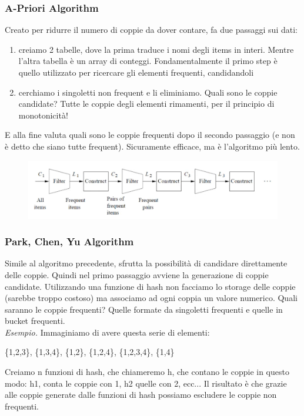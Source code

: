 \subsubsection{A-Priori Algorithm}
Creato per ridurre il numero di coppie da dover contare, fa due passaggi sui dati:
\begin{enumerate}
    \item creiamo 2 tabelle, dove la prima traduce i nomi degli items in interi. Mentre l'altra tabella è un array di conteggi. Fondamentalmente il primo step è quello utilizzato per ricercare gli elementi frequenti, candidandoli
    \item cerchiamo i singoletti non frequent e li eliminiamo. Quali sono le coppie candidate? Tutte le coppie degli elementi rimamenti, per il principio di monotonicità! 
\end{enumerate}
E alla fine valuta quali sono le coppie frequenti dopo il secondo passaggio (e non è detto che siano tutte frequent). Sicuramente efficace, ma è l'algoritmo più lento. 
\\
\begin{figure}[th]
    \centering
    \includegraphics[scale=0.5]{FrequentItems/img/apriori.png}
\end{figure}

\subsubsection{Park, Chen, Yu Algorithm}
Simile al algoritmo precedente, sfrutta la possibilità di candidare direttamente delle coppie. Quindi nel primo passaggio avviene la generazione di coppie candidate. Utilizzando una funzione di hash non facciamo lo storage delle coppie (sarebbe troppo costoso) ma associamo ad ogni coppia un valore numerico. Quali saranno le coppie frequenti? Quelle formate da singoletti frequenti e quelle in bucket frequenti. 
\\
\textit{Esempio.} Immaginiamo di avere questa serie di elementi:
\begin{center}
    \{1,2,3\}, \{1,3,4\}, \{1,2\},  \{1,2,4\}, \{1,2,3,4\}, \{1,4\}
\end{center}
Creiamo n funzioni di hash, che chiameremo h, che contano le coppie in questo modo: h1, conta le coppie con 1, h2 quelle con 2, ecc... Il risultato è che grazie alle coppie generate dalle funzioni di hash possiamo escludere le coppie non frequenti. 

